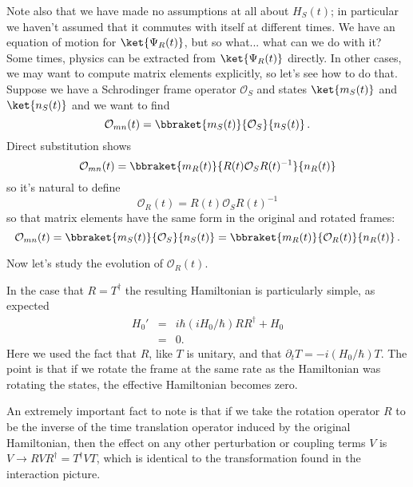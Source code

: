 Note also that we have made no assumptions at all about $H_S(t)$; in particular we haven't assumed that it commutes with itself at different times.
We have an equation of motion for $\ket{\Psi_R(t)}$, but so what... what can we do with it?
Some times, physics can be extracted from $\ket{\Psi_R(t)}$ directly.
In other cases, we may want to compute matrix elements explicitly, so let's see how to do that.
Suppose we have a Schrodinger frame operator $\mathcal{O}_S$ and states $\ket{m_S(t)}$ and $\ket{n_S(t)}$ and we want to find
\begin{equation*}
  \mathcal{O}_{m n}(t) = \bbraket{m_S(t)}{\mathcal{O}_S}{n_S(t)} \, .
\end{equation*}
Direct substitution shows
\begin{equation*}
  \mathcal{O}_{m n}(t) = \bbraket{m_R(t)}{R(t) \mathcal{O}_S R(t)^{-1}}{n_R(t)}
\end{equation*}
so it's natural to define
\begin{equation*}
  \mathcal{O}_R(t) = R(t) \mathcal{O}_S R(t)^{-1}
\end{equation*}
so that matrix elements have the same form in the original and rotated frames:
\begin{equation}
  \mathcal{O}_{mn}(t)
  = \bbraket{m_S(t)}{\mathcal{O}_S}{n_S(t)}
  = \bbraket{m_R(t)}{\mathcal{O}_R(t)}{n_R(t)}
  \, .
\end{equation}

Now let's study the evolution of $\mathcal{O}_R(t)$.


In the case that $R=T^{\dagger}$ the resulting Hamiltonian is particularly simple, as expected \begin{eqnarray}
H_0' &=& i\hbar (iH_0/\hbar)RR^{\dagger} + H_0 \\
&=& 0. \end{eqnarray}
Here we used the fact that $R$, like $T$ is unitary, and that $\partial_t T = -i(H_0/\hbar)T$. The point is that if we rotate the frame at the same rate as the Hamiltonian was rotating the states, the effective Hamiltonian becomes zero.

An extremely important fact to note is that if we take the rotation operator $R$ to be the inverse of the time translation operator induced by the original Hamiltonian, then the effect on any other perturbation or coupling terms $V$ is $V\rightarrow RVR^{\dagger} = T^{\dagger}VT$, which is identical to the transformation found in the interaction picture.
